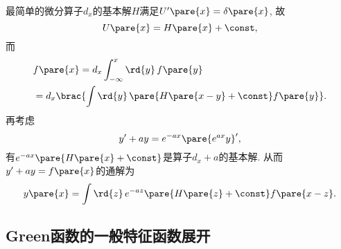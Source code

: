 \documentclass[hidelinks]{ctexart}
\begin{document}
\begin{sample}
    \begin{ex}
        最简单的微分算子$d_x$的基本解$H$满足$U'\pare{x} = \delta\pare{x}$, 故
        \[ U\pare{x} = H\pare{x} + \const, \]
        而
        \begin{align*}
            & f\pare{x} = d_x \int_{-\infty}^x \rd{y}\,f\pare{y} \\
            &= d_x \brac{\int \rd{y}\, \pare{H\pare{x-y} + \const}f\pare{y}}.
        \end{align*}
        再考虑
        \[ y' + ay = e^{-ax}\pare{e^{ax}y}', \]
        有$e^{-ax}\pare{H\pare{x} + \const}$是算子$d_x + a$的基本解. 从而$y' + ay = f\pare{x}$的通解为
        \[ y\pare{x} = \int \rd{z}\,e^{-az}\pare{H\pare{z} + \const}f\pare{x-z}. \]
    \end{ex}
\end{sample}


\subsection{Green函数的一般特征函数展开} %
\label{sub:green函数的一般特征函数展开}
\end{document}
